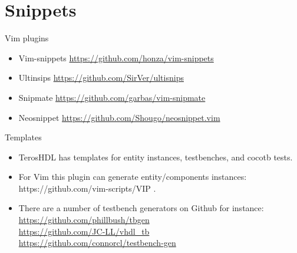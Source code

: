 \documentclass[aspectratio=169]{beamer}
\begin{document}
\section*{Snippets}
\begin{frame}{\secname}
  \begin{block}{Vim plugins}
    \begin{itemize}
      \item Vim-snippets \url{https://github.com/honza/vim-snippets}
      \item Ultinsips \url{https://github.com/SirVer/ultisnips}
      \item Snipmate  \url{https://github.com/garbas/vim-snipmate}
      \item Neosnippet \url{https://github.com/Shougo/neosnippet.vim} 
    \end{itemize} 
  \end{block}

  \begin{block}{Templates}
    \begin{itemize}
      \item TerosHDL has templates for entity instances, testbenches, and cocotb tests.
      \item For Vim this plugin can generate entity/components instances: https://github.com/vim-scripts/VIP .
      \item There are a number of testbench generators on Github for instance: \\
        \url{https://github.com/phillbush/tbgen}\\
        \url{https://github.com/JC-LL/vhdl_tb}\\
        \url{https://github.com/connorcl/testbench-gen}\\
    \end{itemize}
    
  \end{block}
    
\end{frame}

\end{document}
